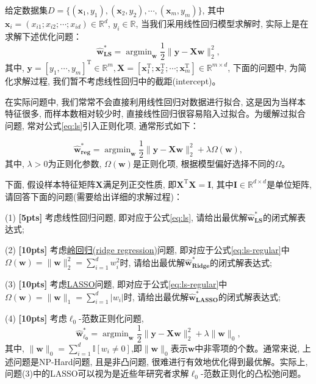 \documentclass[a4paper,UTF8]{article}
\numberwithin{equation}{section}
\theoremstyle{definition}
\begin{document}
给定数据集$D = \{(\mathbf{x}_1,y_1),(\mathbf{x}_2,y_2),\cdots,(\mathbf{x}_m,y_m)\}$, 其中$\mathbf{x}_i = (x_{i1};x_{i2};\cdots;x_{id}) \in \mathbb{R}^d$, $y_i \in \mathbb{R}$, 当我们采用线性回归模型求解时, 实际上是在求解下述优化问题：
\begin{equation}
\label{eq:ls}
\hat{\mathbf{w}}_{\textbf{LS}}^* = \mathop{\arg\min}_{\mathbf{w}} \frac{1}{2}\lVert \mathbf{y} - \mathbf {X}\mathbf{w} \rVert_2^2,
\end{equation}
其中, $\mathbf{y} = [y_1,\cdots,y_m]^\mathrm{T} \in \mathbb{R}^m, \mathbf{X} = [\mathbf{x}_1^\mathrm{T};\mathbf{x}_2^\mathrm{T};\cdots;\mathbf{x}_m^\mathrm{T}]\in \mathbb{R}^{m\times d}$, 下面的问题中, 为简化求解过程, 我们暂不考虑线性回归中的截距(intercept)。

在实际问题中, 我们常常不会直接利用线性回归对数据进行拟合, 这是因为当样本特征很多, 而样本数相对较少时, 直接线性回归很容易陷入过拟合。为缓解过拟合问题, 常对公式\eqref{eq:ls}引入正则化项, 通常形式如下：

\begin{equation}
\label{eq:ls-regular}
\hat{\mathbf{w}}_{\textbf{reg}}^* = \mathop{\arg\min}_{\mathbf{w}} \frac{1}{2}\lVert \mathbf{y} - \mathbf X \mathbf{w} \rVert_2^2 +\lambda \Omega(\mathbf{w}),
\end{equation}
其中, $\lambda> 0$为正则化参数, $\Omega(\mathbf{w})$是正则化项, 根据模型偏好选择不同的$\Omega$。

下面, 假设样本特征矩阵$\mathbf{X}$满足列正交性质, 即$\mathbf{X}^\mathrm{T}\mathbf{X} = \mathbf{I}$, 其中$\mathbf{I}\in \mathbb{R}^{d\times d}$是单位矩阵, 请回答下面的问题(需要给出详细的求解过程)：

(1) \textbf{[5pts]} 考虑线性回归问题, 即对应于公式\eqref{eq:ls}, 请给出最优解$\hat{\mathbf{w}}_{\textbf{LS}}^*$的闭式解表达式;

(2) \textbf{[10pts]} 考虑\href{https://en.wikipedia.org/wiki/Tikhonov_regularization}{岭回归(ridge regression)}问题, 即对应于公式\eqref{eq:ls-regular}中$\Omega(\mathbf{w}) = \lVert \mathbf{w}\rVert_2^2=\sum_{i=1}^d w_i^2$时, 请给出最优解$\hat{\mathbf{w}}_{\textbf{Ridge}}^*$的闭式解表达式;

(3) \textbf{[10pts]} 考虑\href{https://en.wikipedia.org/wiki/LASSO}{LASSO}问题, 即对应于公式\eqref{eq:ls-regular}中$\Omega(\mathbf{w}) = \lVert \mathbf{w}\rVert_1=\sum_{i=1}^d \vert w_i\vert$时, 请给出最优解$\hat{\mathbf{w}}_{\textbf{LASSO}}^*$的闭式解表达式;

(4) \textbf{[10pts]} 考虑$\ell_0$-范数正则化问题, 
\begin{equation}
\label{eq:ls-l0}
\hat{\mathbf{w}}_{\mathbf{\ell_0}}^* = \mathop{\arg\min}_{\mathbf{w}} \frac{1}{2}\lVert \mathbf{y} - \mathbf X \mathbf{w} \rVert_2^2 +\lambda \lVert \mathbf{w}\rVert_0,
\end{equation}
其中, $\lVert \mathbf{w}\rVert_0=\sum_{i=1}^d \mathbb{I}[w_i \neq 0]$,即$\lVert \mathbf{w}\rVert_0$表示$\mathbf{w}$中非零项的个数。通常来说, 上述问题是NP-Hard问题, 且是非凸问题, 很难进行有效地优化得到最优解。实际上, 问题(3)中的LASSO可以视为是近些年研究者求解$\ell_0$-范数正则化的凸松弛问题。
\end{document}
